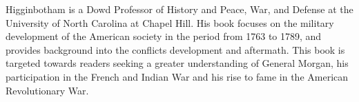 Higginbotham is a Dowd Professor of History and Peace, War, and Defense at the
University of North Carolina at Chapel Hill. His book focuses on the military
development of the American society in the period from 1763 to 1789, and
provides background into the conflicts development and aftermath. This book is
targeted towards readers seeking a greater understanding of General Morgan, his
participation in the French and Indian War and his rise to fame in the American
Revolutionary War. 
%
